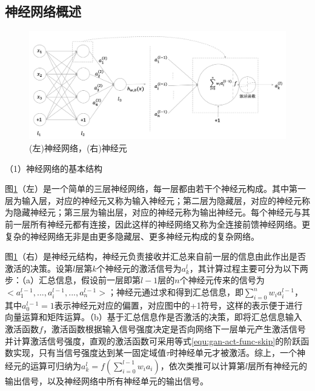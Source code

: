 \subsection{神经网络概述}
\label{tsgan-nn}

\begin{figure}[H]
\centering
\includegraphics[scale=0.5]{figures/gan-neural-net.png}
\caption{(左)神经网络，(右)神经元}
\label{fig:gan-nn}
\end{figure}

（1）神经网络的基本结构

图\ref{fig:gan-nn}（左）是一个简单的三层神经网络，每一层都由若干个神经元构成。其中第一层为输入层，对应的神经元又称为输入神经元；第二层为隐藏层，对应的神经元称为隐藏神经元；第三层为输出层，对应的神经元称为输出神经元。每个神经元与其前一层所有神经元都有连接，因此这样的神经网络又称为全连接前馈神经网络。更复杂的神经网络无非是由更多隐藏层、更多神经元构成的复杂网络。

图\ref{fig:gan-nn}（右）是神经元结构，神经元负责接收并汇总来自前一层的信息由此作出是否激活的决策。设第$l$层第$k$个神经元的激活信号为$a_{k}^{l}$，其计算过程主要可分为以下两步：（a）汇总信息，假设前一层即第$l-1$层的$n$个神经元传来的信号为$<a_{1}^{l-1},...,a_{i}^{l-1}, ..., a_{n}^{l-1}>$；神经元通过求和得到汇总信息，即$\sum_{i=0}^{n}w_{i}a_{i}^{l-1}$，其中$a_{0}^{l-1}=1$表示神经元对应的偏置，对应图中的+1符号，这样的表示便于进行向量运算和矩阵运算。（b）基于汇总信息作是否激活的决策，即将汇总信息输入激活函数$f$，激活函数根据输入信号强度决定是否向网络下一层单元产生激活信号并计算激活信号强度，直观的激活函数可采用等式\ref{equ:gan-act-func-skip}的阶跃函数实现，只有当信号强度达到某一固定域值$\tau$时神经单元才被激活。综上，一个神经元的运算可归纳为$a_{k}^{l}=f(\sum_{i=0}^{l-1}w_{i}a_{i})$，依次类推可以计算第$l$层所有神经元的输出信号，以及神经网络中所有神经单元的输出信号。

